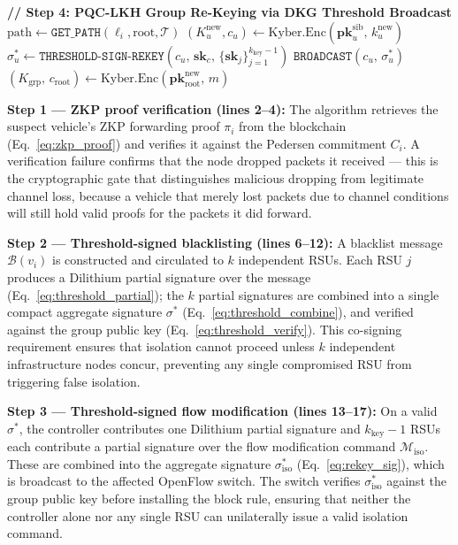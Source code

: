 \documentclass[12pt, a4paper]{report}
\begin{document}
\begin{algorithm}[!htbp]
\begin{algorithmic}[1]
    \State \textbf{// Step 4: PQC-LKH Group Re-Keying via
      DKG Threshold Broadcast}
    \State $\mathrm{path} \gets
      \texttt{GET\_PATH}(\ell_i, \mathrm{root}, \mathcal{T})$
      \State $(K_u^{\mathrm{new}}, c_u) \gets
        \mathrm{Kyber.Enc}
        (\mathbf{pk}_u^{\mathrm{sib}},\,
        k_u^{\mathrm{new}})$
      \State $\sigma_u^* \gets
        \texttt{THRESHOLD-SIGN-REKEY}
        (c_u,\, \mathbf{sk}_c,\,
        \{\mathbf{sk}_j\}_{j=1}^{k_{\text{key}}-1})$
      \State $\texttt{BROADCAST}(c_u,\, \sigma_u^*)$
    \EndFor
    \State $(K_{\text{grp}},\, c_{\mathrm{root}}) \gets
      \mathrm{Kyber.Enc}
      (\mathbf{pk}_{\mathrm{root}}^{\mathrm{new}},\, m)$
  
  
  
  \EndIf




\EndProcedure
\end{algorithmic}
\label{alg:pqc_mit}
\end{algorithm}

\textbf{Step 1 — ZKP proof verification (lines 2--4):} The algorithm retrieves
the suspect vehicle's ZKP forwarding proof $\pi_i$ from the blockchain
(Eq.~\eqref{eq:zkp_proof}) and verifies it against the Pedersen commitment
$C_i$. A verification failure confirms that the node dropped packets it
received — this is the cryptographic gate that distinguishes malicious dropping
from legitimate channel loss, because a vehicle that merely lost packets due to
channel conditions will still hold valid proofs for the packets it did forward.

\textbf{Step 2 — Threshold-signed blacklisting (lines 6--12):} A blacklist
message $\mathcal{B}(v_i)$ is constructed and circulated to $k$ independent
RSUs. Each RSU $j$ produces a Dilithium partial signature over the message
(Eq.~\eqref{eq:threshold_partial}); the $k$ partial signatures are combined
into a single compact aggregate signature $\sigma^*$
(Eq.~\eqref{eq:threshold_combine}), and verified against the group public key
(Eq.~\eqref{eq:threshold_verify}). This co-signing requirement ensures that
isolation cannot proceed unless $k$ independent infrastructure nodes concur,
preventing any single compromised RSU from triggering false isolation.

\textbf{Step 3 — Threshold-signed flow modification (lines 13--17):}
On a valid $\sigma^*$, the controller contributes one Dilithium partial
signature and $k_{\text{key}}-1$ RSUs each contribute a partial signature
over the flow modification command $\mathcal{M}_{\text{iso}}$. These are
combined into the aggregate signature $\sigma_{\text{iso}}^*$
(Eq.~\eqref{eq:rekey_sig}), which is broadcast to the affected OpenFlow
switch. The switch verifies $\sigma_{\text{iso}}^*$ against the group
public key before installing the block rule, ensuring that neither the
controller alone nor any single RSU can unilaterally issue a valid
isolation command.
\end{document}
